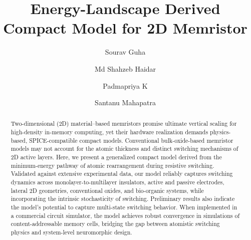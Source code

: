 \documentclass[aip,apl,reprint,floatfix]{revtex4-2}
\begin{document}
\nocite{aip41Control} %

\title{Energy-Landscape Derived Compact Model for 2D Memristor}

\author{Sourav Guha}


\author{Md Shahzeb Haidar}

\author{Padmapriya K}

\author{Santanu Mahapatra}

\begin{abstract}
Two-dimensional (2D) material–based memristors promise ultimate vertical scaling for high-density in-memory computing, yet their hardware realization demands physics-based, SPICE-compatible compact models. Conventional bulk-oxide-based memristor models may not account for the atomic thickness and distinct switching mechanisms of 2D active layers. Here, we present a generalized compact model derived from the minimum-energy pathway of atomic rearrangement during resistive switching. Validated against extensive experimental data, our model reliably captures switching dynamics across monolayer-to-multilayer insulators, active and passive electrodes, lateral 2D geometries, conventional oxides, and bio-organic systems, while incorporating the intrinsic stochasticity of switching. Preliminary results also indicate the model's potential to capture multi-state switching behavior. When implemented in a commercial circuit simulator, the model achieves robust convergence in simulations of content-addressable memory cells, bridging the gap between atomistic switching physics and system-level neuromorphic design.
\end{abstract}

\maketitle
\end{document}
